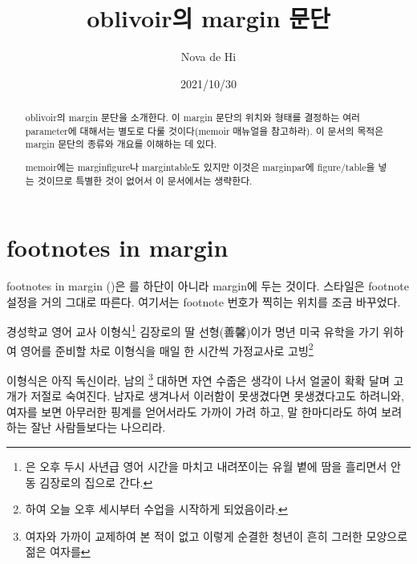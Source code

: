 \documentclass{oblivoir}
\begin{document}
\title{oblivoir의 margin 문단}
\author{Nova de Hi}
\date{2021/10/30}
\maketitle

\begin{abstract}
oblivoir의 margin 문단을 소개한다. 이 margin 문단의 위치와 형태를
결정하는 여러 parameter에 대해서는 별도로 다룰 것이다(memoir 매뉴얼을
참고하라). 이 문서의 목적은 margin 문단의 종류와 개요를 이해하는 데 있다.

memoir에는 marginfigure나 margintable도 있지만 이것은 marginpar에
figure/table을 넣는 것이므로 특별한 것이 없어서 이 문서에서는 생략한다.
\end{abstract}

\tableofcontents*

\newpage

\setlength\footmarksep{0em}
\setlength\footmarkwidth{0pt}
\setlength\footparindent{0pt}
\footnotesinmargin

\section{footnotes in margin}

\begin{framed}
footnotes in margin ()은 를 하단이 아니라
margin에 두는 것이다. 스타일은 footnote 설정을 거의 그대로 따른다. 여기서는 footnote 번호가
찍히는 위치를 조금 바꾸었다. 
\end{framed}

경성학교 영어 교사 이형식\footnote{은 오후 두시 사년급 영어 시간을 마치고 내려쪼이는 유월 볕에 땀을 흘리면서 안동 김장로의 집으로 간다.} 김장로의 딸 선형(善馨)이가 명년 미국 유학을 가기 위하여 영어를 준비할 차로 이형식을 매일 한 시간씩 가정교사로 고빙\footnote{하여 오늘 오후 세시부터 수업을 시작하게 되었음이라.}

이형식은 아직 독신이라, 남의 \footnote{여자와 가까이 교제하여 본 적이 없고 이렇게 순결한 청년이 흔히 그러한 모양으로 젊은 여자를} 대하면 자연 수줍은 생각이 나서 얼굴이 확확 달며 고개가 저절로 숙여진다. 남자로 생겨나서 이러함이 못생겼다면 못생겼다고도 하려니와, 여자를 보면 아무러한 핑계를 얻어서라도 가까이 가려 하고, 말 한마디라도 하여 보려 하는 잘난 사람들보다는 나으리라.
\end{document}
